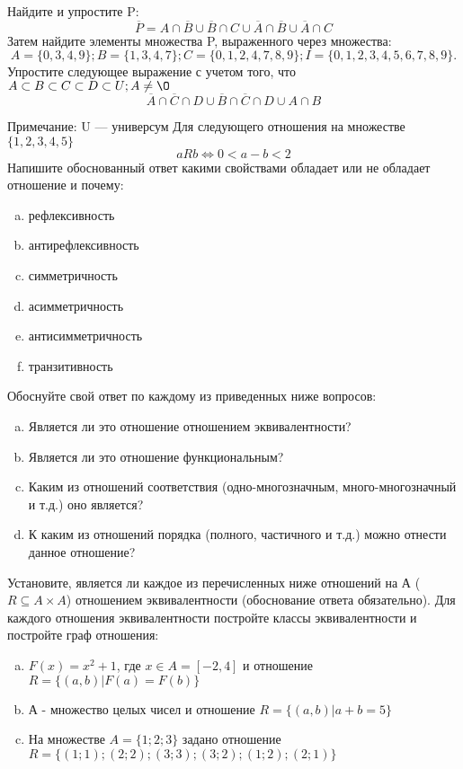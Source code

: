 \documentclass[10pt]{exam}
\begin{document}
\begin{questions}
\question
Найдите и упростите P:
\begin{equation*}
\overline{P} = A \cap \overline{B} \cup \overline{B} \cap C \cup \overline{A} \cap \overline{B} \cup \overline{A} \cap C
\end{equation*}
Затем найдите элементы множества P, выраженного через множества:
\begin{equation*}
A = \{0, 3, 4, 9\}; 
B = \{1, 3, 4, 7\};
C = \{0, 1, 2, 4, 7, 8, 9\};
I = \{0, 1, 2, 3, 4, 5, 6, 7, 8, 9\}.
\end{equation*}\question
Упростите следующее выражение с учетом того, что $A\subset B \subset C \subset D \subset U; A \neq \O$
\begin{equation*}
\overline{A} \cap \overline{C} \cap D \cup \overline{B} \cap \overline{C} \cap D \cup A \cap B
\end{equation*}

Примечание: U — универсум\question
Для следующего отношения на множестве $\{1, 2, 3, 4, 5\}$ 
\begin{equation*}
aRb \iff 0 < a-b<2
\end{equation*}
Напишите обоснованный ответ какими свойствами обладает или не обладает отношение и почему:   
\begin{enumerate} [a)]\setcounter{enumi}{0}
\item рефлексивность
\item антирефлексивность
\item симметричность
\item асимметричность
\item антисимметричность
\item транзитивность
\end{enumerate}

Обоснуйте свой ответ по каждому из приведенных ниже вопросов:
\begin{enumerate} [a)]\setcounter{enumi}{0}
    \item Является ли это отношение отношением эквивалентности?
    \item Является ли это отношение функциональным?
    \item Каким из отношений соответствия (одно-многозначным, много-многозначный и т.д.) оно является?
    \item К каким из отношений порядка (полного, частичного и т.д.) можно отнести данное отношение?
\end{enumerate}
\question
Установите, является ли каждое из перечисленных ниже отношений на А ($R \subseteq A \times A$) отношением эквивалентности (обоснование ответа обязательно). Для каждого отношения эквивалентности постройте классы эквивалентности и постройте граф отношения:
\begin{enumerate} [a)]\setcounter{enumi}{0}
\item $F(x)=x^{2}+1$, где $x \in A = [-2, 4]$ и отношение $R = \{(a,b)|F(a) = F(b)\}$
\item А - множество целых чисел и отношение $R = \{(a,b)|a + b = 5\}$
\item На множестве $A = \{1; 2; 3\}$ задано отношение $R = \{(1; 1); (2; 2); (3; 3); (3; 2); (1; 2); (2; 1)\}$


\end{enumerate}
\end{questions}
\end{document}
